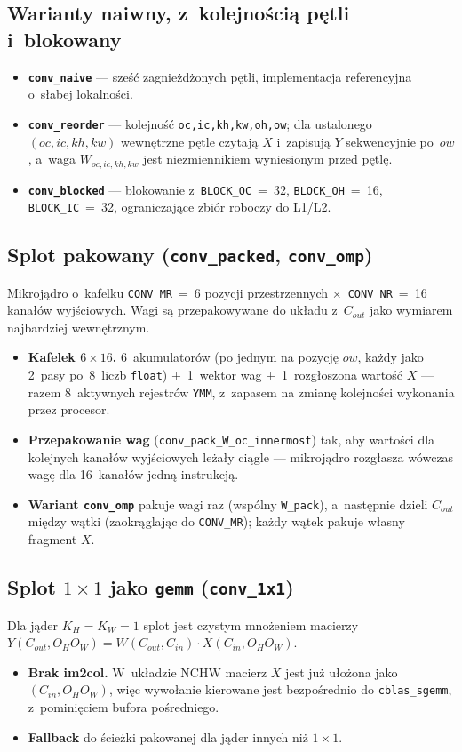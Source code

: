 \documentclass[a4paper,12pt]{book} %
\newcommand{\kod}[1]{\texttt{#1}}
\begin{document}
\subsection{Warianty naiwny, z~kolejnością pętli i~blokowany}
\begin{itemize}
\item \textbf{\kod{conv\_naive}} --- sześć zagnieżdżonych pętli, implementacja
  referencyjna o~słabej lokalności.
\item \textbf{\kod{conv\_reorder}} --- kolejność \kod{oc,ic,kh,kw,oh,ow};
  dla ustalonego $(oc,ic,kh,kw)$ wewnętrzne pętle czytają $X$ i~zapisują $Y$
  sekwencyjnie po~$ow$, a~waga $W_{oc,ic,kh,kw}$ jest niezmiennikiem wyniesionym
  przed pętlę.
\item \textbf{\kod{conv\_blocked}} --- blokowanie z~\kod{BLOCK\_OC}~=~32,
  \kod{BLOCK\_OH}~=~16, \kod{BLOCK\_IC}~=~32, ograniczające zbiór roboczy do L1/L2.
\end{itemize}

\subsection{Splot pakowany (\kod{conv\_packed}, \kod{conv\_omp})}
Mikrojądro o~kafelku \kod{CONV\_MR}~=~6 pozycji przestrzennych
$\times$~\kod{CONV\_NR}~=~16 kanałów wyjściowych. Wagi są przepakowywane do układu
z~$C_{out}$ jako wymiarem najbardziej wewnętrznym.
\begin{itemize}
\item \textbf{Kafelek $6\times16$.} 6~akumulatorów (po jednym na pozycję $ow$,
  każdy jako 2~pasy po~8~liczb \kod{float}) $+$~1~wektor wag $+$~1~rozgłoszona
  wartość $X$ --- razem 8~aktywnych rejestrów \kod{YMM}, z~zapasem na zmianę
  kolejności wykonania przez procesor.
\item \textbf{Przepakowanie wag} (\kod{conv\_pack\_W\_oc\_innermost}) tak, aby
  wartości dla kolejnych kanałów wyjściowych leżały ciągle --- mikrojądro
  rozgłasza wówczas wagę dla 16~kanałów jedną instrukcją.
\item \textbf{Wariant \kod{conv\_omp}} pakuje wagi raz (wspólny \kod{W\_pack}),
  a~następnie dzieli $C_{out}$ między wątki (zaokrąglając do \kod{CONV\_MR});
  każdy wątek pakuje własny fragment $X$.
\end{itemize}

\subsection{Splot $1\times1$ jako \kod{gemm} (\kod{conv\_1x1})}
Dla jąder $K_H=K_W=1$ splot jest czystym mnożeniem macierzy
$Y(C_{out},O_H O_W)=W(C_{out},C_{in})\cdot X(C_{in},O_H O_W)$.
\begin{itemize}
\item \textbf{Brak im2col.} W~układzie NCHW macierz $X$ jest już ułożona jako
  $(C_{in},O_H O_W)$, więc wywołanie kierowane jest bezpośrednio do
  \kod{cblas\_sgemm}, z~pominięciem bufora pośredniego.
\item \textbf{Fallback} do ścieżki pakowanej dla jąder innych niż $1\times1$.
\end{itemize}
\end{document}
